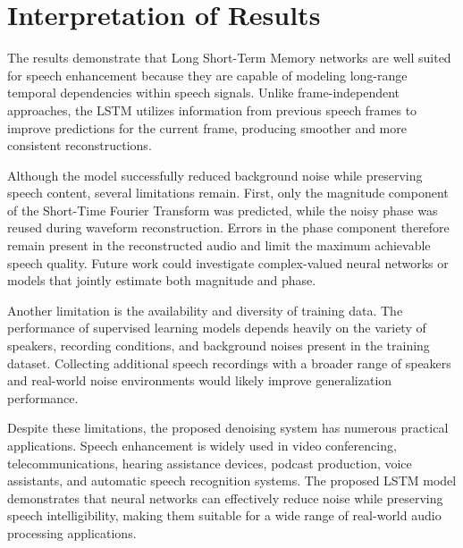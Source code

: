 \documentclass[11pt, letterpaper]{article}
\begin{document}
\section{Interpretation of Results}

The results demonstrate that Long Short-Term Memory networks are well suited for speech enhancement because they are capable of modeling long-range temporal dependencies within speech signals. Unlike frame-independent approaches, the LSTM utilizes information from previous speech frames to improve predictions for the current frame, producing smoother and more consistent reconstructions.

Although the model successfully reduced background noise while preserving speech content, several limitations remain. First, only the magnitude component of the Short-Time Fourier Transform was predicted, while the noisy phase was reused during waveform reconstruction. Errors in the phase component therefore remain present in the reconstructed audio and limit the maximum achievable speech quality. Future work could investigate complex-valued neural networks or models that jointly estimate both magnitude and phase.

Another limitation is the availability and diversity of training data. The performance of supervised learning models depends heavily on the variety of speakers, recording conditions, and background noises present in the training dataset. Collecting additional speech recordings with a broader range of speakers and real-world noise environments would likely improve generalization performance.

Despite these limitations, the proposed denoising system has numerous practical applications. Speech enhancement is widely used in video conferencing, telecommunications, hearing assistance devices, podcast production, voice assistants, and automatic speech recognition systems. The proposed LSTM model demonstrates that neural networks can effectively reduce noise while preserving speech intelligibility, making them suitable for a wide range of real-world audio processing applications.
\end{document}
